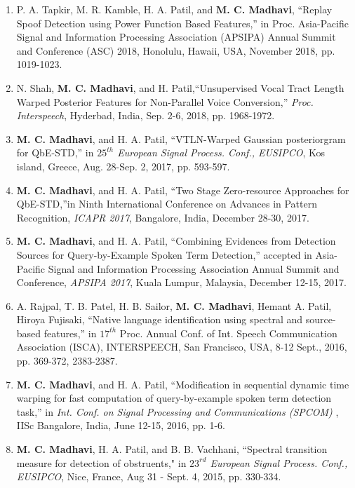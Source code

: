 \documentclass[10pt]{article}
\begin{document}
\begin{enumerate}[resume]
\item P. A. Tapkir, M. R. Kamble, H. A. Patil, and  \textbf{M. C. Madhavi}, ``Replay Spoof Detection using Power Function Based Features,'' in Proc. Asia-Pacific Signal and Information Processing Association (APSIPA) Annual Summit and Conference (ASC) 2018, Honolulu, Hawaii, USA, November 2018, pp. 1019-1023.
				
\item N. Shah, \textbf{M. C. Madhavi}, and H. Patil,``Unsupervised Vocal Tract Length Warped Posterior Features for Non-Parallel Voice Conversion,'' \textit{Proc. Interspeech}, Hyderbad, India, Sep. 2-6, 2018, pp. 1968-1972.
				
\item  \textbf{M. C. Madhavi}, and H. A. Patil, ``VTLN-Warped Gaussian posteriorgram for QbE-STD,'' in \textit{$25^{th}$ European	Signal Process. Conf., EUSIPCO}, Kos island, Greece, Aug. 28-Sep. 2, 2017, pp. 593-597.

\item \textbf{M. C. Madhavi}, and H. A. Patil, ``Two Stage Zero-resource Approaches for QbE-STD,''in Ninth International Conference on Advances in Pattern Recognition, \textit{ICAPR 2017}, Bangalore, India, December 28-30, 2017.

\item 	\textbf{M. C. Madhavi}, and H. A. Patil, ``Combining Evidences from Detection Sources for Query-by-Example Spoken Term Detection,'' accepted in Asia-Pacific Signal and Information Processing Association Annual Summit and Conference, \textit{APSIPA 2017}, Kuala Lumpur, Malaysia, December 12-15, 2017. 

\item A. Rajpal, T. B. Patel, H. B. Sailor, \textbf{M. C. Madhavi}, Hemant A. Patil, Hiroya Fujisaki, ``Native language identification using spectral and source-based features,''  in $ 17^{th} $ Proc. Annual  Conf. of Int. Speech Communication Association (ISCA), INTERSPEECH, San Francisco, USA, 8-12 Sept., 2016, pp. 369-372,  2383-2387.

\item 	\textbf{M. C. Madhavi}, and H. A. Patil, ``Modification in sequential dynamic time warping for fast computation of query-by-example spoken term detection task,''  in \textit{Int. Conf. on Signal Processing and Communications (SPCOM)} , IISc Bangalore, India, June 12-15, 2016, pp. 1-6.

\item \textbf{M. C. Madhavi}, H. A. Patil, and B. B. Vachhani, ``Spectral transition measure for detection of obstruents," in \textit{$23^{rd}$ European
Signal Process. Conf., EUSIPCO}, Nice, France, Aug 31 - Sept. 4, 2015, pp. 330-334.


\end{enumerate}
\end{document}
